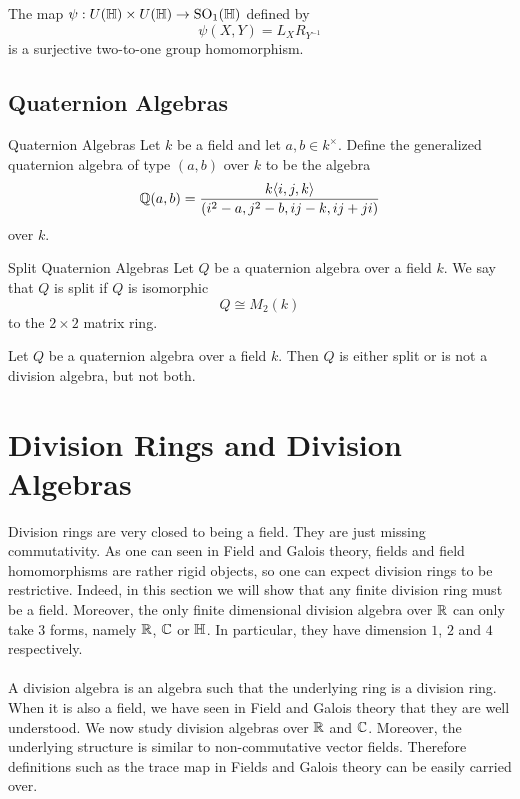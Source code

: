 \documentclass[a4paper]{article}
\begin{document}
\begin{thm}{}{} The map $\psi:U(\mathbb{H})\times U(\mathbb{H})\to\text{SO}_1(\mathbb{H})$ defined by $$\psi(X,Y)=L_XR_{Y^{-1}}$$ is a surjective two-to-one group homomorphism. 
\end{thm}

\subsection{Quaternion Algebras}
\begin{defn}{Quaternion Algebras}{} Let $k$ be a field and let $a,b\in k^\times$. Define the generalized quaternion algebra of type $(a,b)$ over $k$ to be the algebra $$\mathbb{Q}(a,b)=\frac{k\langle i,j,k\rangle}{(i^2-a,j^2-b,ij-k,ij+ji)}$$ over $k$. 
\end{defn}

\begin{defn}{Split Quaternion Algebras}{} Let $Q$ be a quaternion algebra over a field $k$. We say that $Q$ is split if $Q$ is isomorphic $$Q\cong M_2(k)$$ to the $2\times 2$ matrix ring. 
\end{defn}

\begin{thm}{}{} Let $Q$ be a quaternion algebra over a field $k$. Then $Q$ is either split or is not a division algebra, but not both. 
\end{thm}

\pagebreak
\section{Division Rings and Division Algebras}
Division rings are very closed to being a field. They are just missing commutativity. As one can seen in Field and Galois theory, fields and field homomorphisms are rather rigid objects, so one can expect division rings to be restrictive. Indeed, in this section we will show that any finite division ring must be a field. Moreover, the only finite dimensional division algebra over $\mathbb{R}$ can only take $3$ forms, namely $\mathbb{R}$, $\mathbb{C}$ or $\mathbb{H}$. In particular, they have dimension $1$, $2$ and $4$ respectively. \\~\\

A division algebra is an algebra such that the underlying ring is a division ring. When it is also a field, we have seen in Field and Galois theory that they are well understood. We now study division algebras over $\mathbb{R}$ and $\mathbb{C}$. Moreover, the underlying structure is similar to non-commutative vector fields. Therefore definitions such as the trace map in Fields and Galois theory can be easily carried over. 
\end{document}
